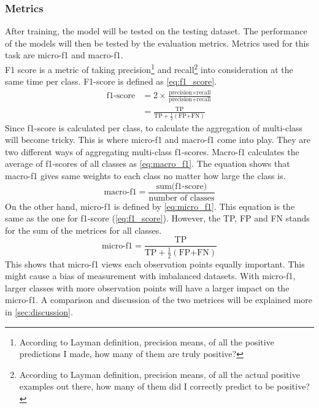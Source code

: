 \documentclass[10pt, a4paper, twocolumn]{article} %
\begin{document}
\subsubsection{Metrics}
After training, the model will be tested on the testing dataset. The performance of the models will then be tested by 
the evaluation metrics. Metrics used for this task are micro-f1 and macro-f1.\\[10pt]
F1 score is a metric of taking precision\footnote{According to Layman definition, precision means, 
of all the positive predictions I made, how many of them are truly positive?} and 
recall\footnote{According to Layman definition, precision means, of all the actual positive examples 
out there, how many of them did I correctly predict to be positive?} into consideration at the 
same time per class. F1-score is defined as \autoref{eq:f1_score}.\\[10pt]
\begin{equation}\label{eq:f1_score}
	\begin{split}
		\text{f1-score} &= 2\times \frac{\text{precision} \times \text{recall}}{\text{precision} + \text{recall}}\\
		&= \frac{\text{TP}}{\text{TP}+\frac{1}{2}(\text{FP+FN})}
	\end{split}
\end{equation}
Since f1-score is calculated per class, to calculate the aggregation of multi-class will become tricky. 
This is where micro-f1 and macro-f1 come into play. They are two different ways of aggregating multi-class 
f1-scores. Macro-f1 calculates the average of f1-scores of all classes as \autoref{eq:macro_f1}. The equation 
shows that macro-f1 gives same weights to each class no matter how large the class is. 
\begin{equation}\label{eq:macro_f1}
	\text{macro-f1} = \frac{\text{sum(f1-score)}}{\text{number of classes}}
\end{equation}
On the other hand, micro-f1 is defined by \autoref{eq:micro_f1}. This equation is the same as the one for 
f1-score (\autoref{eq:f1_score}). However, the TP, FP and FN stands for the sum of the metrices for all classes.  
\begin{equation}\label{eq:micro_f1}
	\text{micro-f1} = \frac{\text{TP}}{\text{TP}+\frac{1}{2}(\text{FP+FN})}
\end{equation}
This shows that micro-f1 views each observation points equally important. This might cause a bias of measurement 
with imbalanced datasets. With micro-f1, larger classes with more observation points will have a larger impact on 
the micro-f1. A comparison and discussion of the two metrices will be explained more in \autoref{sec:discussion}.
\end{document}
